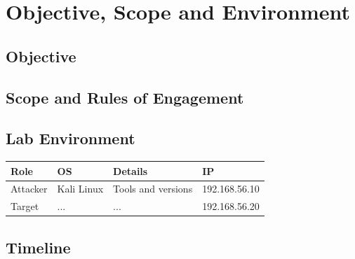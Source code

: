 \section{Objective, Scope and Environment}
\subsection{Objective}
\subsection{Scope and Rules of Engagement}
\subsection{Lab Environment}
\begin{tabularx}{\textwidth}{llXl}
\toprule \textbf{Role} & \textbf{OS} & \textbf{Details} & \textbf{IP}\\ \midrule
Attacker & Kali Linux & Tools and versions & 192.168.56.10\\
Target & ... & ... & 192.168.56.20\\ \bottomrule
\end{tabularx}
\subsection{Timeline}
